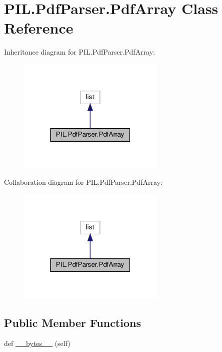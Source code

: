 \hypertarget{classPIL_1_1PdfParser_1_1PdfArray}{}\section{P\+I\+L.\+Pdf\+Parser.\+Pdf\+Array Class Reference}
\label{classPIL_1_1PdfParser_1_1PdfArray}


Inheritance diagram for P\+I\+L.\+Pdf\+Parser.\+Pdf\+Array\+:
\nopagebreak
\begin{figure}[H]
\begin{center}
\leavevmode
\includegraphics[width=199pt]{classPIL_1_1PdfParser_1_1PdfArray__inherit__graph}
\end{center}
\end{figure}


Collaboration diagram for P\+I\+L.\+Pdf\+Parser.\+Pdf\+Array\+:
\nopagebreak
\begin{figure}[H]
\begin{center}
\leavevmode
\includegraphics[width=199pt]{classPIL_1_1PdfParser_1_1PdfArray__coll__graph}
\end{center}
\end{figure}
\subsection*{Public Member Functions}
\begin{DoxyCompactItemize}
\item 
def \hyperlink{classPIL_1_1PdfParser_1_1PdfArray_a7be0ddbd4027eb8bfce774f209859600}{\+\_\+\+\_\+bytes\+\_\+\+\_\+} (self)
\end{DoxyCompactItemize}


